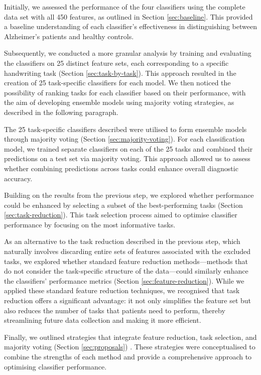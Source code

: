 \documentclass[a4paper, 11pt]{article}
\begin{document}
Initially, we assessed the performance of the four classifiers using the complete data set with all 450 features, as outlined in Section \ref{sec:baseline}. This provided a baseline understanding of each classifier's effectiveness in distinguishing between Alzheimer's patients and healthy controls.

Subsequently, we conducted a more granular analysis by training and evaluating the classifiers on 25 distinct feature sets, each corresponding to a specific handwriting task (Section \ref{sec:task-by-task}). This approach resulted in the creation of 25 task-specific classifiers for each model. We then noticed the possibility of ranking tasks for each classifier based on their performance, with the aim of developing ensemble models using majority voting strategies, as described in the following paragraph.

The 25 task-specific classifiers described were utilised to form ensemble models through majority voting (Section \ref{sec:majority-voting}). For each classification model, we trained separate classifiers on each of the 25 tasks and combined their predictions on a test set via majority voting. This approach allowed us to assess whether combining predictions across tasks could enhance overall diagnostic accuracy.
    
Building on the results from the previous step, we explored whether performance could be enhanced by selecting a subset of the best-performing tasks (Section \ref{sec:task-reduction}). This task selection process aimed to optimise classifier performance by focusing on the most informative tasks.
    
As an alternative to the task reduction described in the previous step, which naturally involves discarding entire sets of features associated with the excluded tasks, we explored whether standard feature reduction methods—methods that do not consider the task-specific structure of the data—\allowbreak could similarly enhance the classifiers' performance metrics (Section \ref{sec:feature-reduction}). While we applied these standard feature reduction techniques, we recognised that task reduction offers a significant advantage: it not only simplifies the feature set but also reduces the number of tasks that patients need to perform, thereby streamlining future data collection and making it more efficient.
    
Finally, we outlined strategies that integrate feature reduction, task selection, and majority voting (Section \ref{sec:proposals}) . These strategies were conceptualised to combine the strengths of each method and provide a comprehensive approach to optimising classifier performance.
\end{document}
